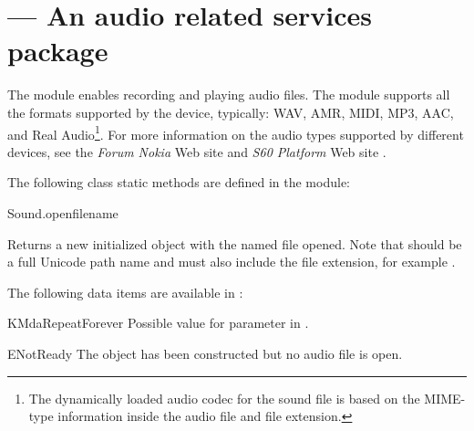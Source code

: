 %
%
%

\section{ ---
  An audio related services package}
\label{sec:audio}


The  module enables recording and playing audio files. The 
 module supports all the formats supported by the device, 
typically: WAV, AMR, MIDI, MP3, AAC, and Real Audio\footnote{The dynamically 
loaded audio codec for the sound file is based on the MIME-type information 
inside the audio file and file extension.}. For more information on the audio 
types supported by different devices, see the \textit{Forum Nokia} Web site 
\cite{S60AudioVideo} and \textit{S60 Platform} Web site 
\cite{S60Developers}. 

The following  class static methods are defined in the 
 module:

\begin{funcdesc}{Sound.open}{filename}

Returns a new initialized  object with the named file opened. 
Note that  should be a full Unicode path name and 
must also include the file extension, for example .
\end{funcdesc}

The following data items are available in :

\begin{datadesc}{KMdaRepeatForever}
Possible value for  parameter in .
\end{datadesc}

\begin{datadesc}{ENotReady}
The  object has been constructed but no audio file is open.
\end{datadesc}

